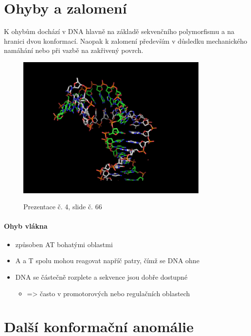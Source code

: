 \documentclass[DIV=8]{scrreprt}
\begin{document}
\section{Ohyby a zalomení} \label{Ohyby a zalomení}


K ohybům dochází v DNA hlavně na základě sekvenčního polymorfismu a na hranici dvou konformací. Naopak k zalomení především v důsledku mechanického namáhání nebo při vazbě na zakřivený povrch.

\begin{figure}
    \caption{Prezentace č. 4, slide č. 66}
    \includegraphics[width=0.85\textwidth]{slides-4/slide-66.jpg}
    \centering
    \label{slides-4-slide-66}
\end{figure}

\paragraph{Ohyb vlákna}
\begin{itemize}[nosep]
    \item způsoben AT bohatými oblastmi
    \item A a T spolu mohou reagovat napříč patry, čímž se DNA ohne
    \item DNA se částečně rozplete a sekvence jsou dobře dostupné
\begin{itemize}[nosep]
    \item => často v promotorových nebo regulačních oblastech
\end{itemize}

\end{itemize}



\section{Další konformační anomálie} \label{Další konformační anomálie}
\end{document}
